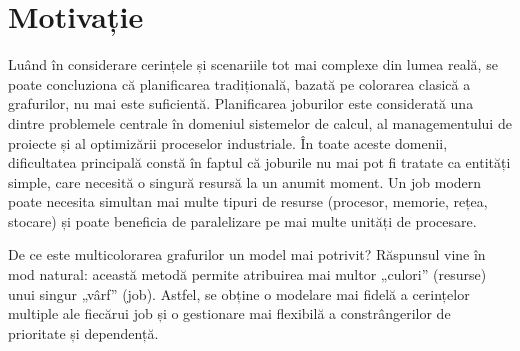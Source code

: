 \chapter*{Motivație} 

 Luând în considerare cerințele și scenariile tot mai complexe din lumea reală, se poate concluziona că planificarea tradițională, bazată pe colorarea clasică a grafurilor, nu mai este suficientă. Planificarea joburilor este considerată una dintre problemele centrale în domeniul sistemelor de calcul, al managementului de proiecte și al optimizării proceselor industriale. În toate aceste domenii, dificultatea principală constă în faptul că joburile nu mai pot fi tratate ca entități simple, care necesită o singură resursă la un anumit moment. Un job modern poate necesita simultan mai multe tipuri de resurse (procesor, memorie, rețea, stocare)  și poate beneficia de paralelizare pe mai multe unități de procesare. 


De ce este multicolorarea grafurilor un model mai potrivit? Răspunsul vine în mod natural: această metodă permite atribuirea mai multor „culori” (resurse) unui singur „vârf” (job). Astfel, se obține o modelare mai fidelă a cerințelor multiple ale fiecărui job și o gestionare mai flexibilă a constrângerilor de prioritate și dependență. 